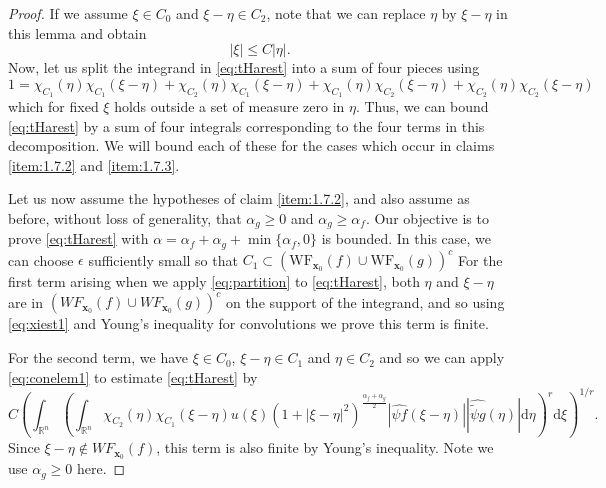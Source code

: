 \documentclass[a4paper,12pt]{amsart}
\numberwithin{equation}{section}
\theoremstyle{plain}
\numberwithin{theorem}{section}
\theoremstyle{definition}
\theoremstyle{remark}
\theoremstyle{remark}
\theoremstyle{remark}
\newcommand{\dd}{\mathrm{d}}  %
\newcommand{\WF}{\mathrm{WF}}                         %
\newcommand{\vx}{{\mathbf{x}}}
\begin{document}
\begin{proof}
    \noindent If we assume $\xi \in C_0$ and $\xi -\eta \in C_2$, note that we can replace $\eta$ by $\xi - \eta$ in this lemma and obtain
    \begin{equation}\label{eq:conelem2}
        |\xi| \leq C |\eta|.
    \end{equation}
    Now, let us split the integrand in \eqref{eq:tHarest} into a sum of four pieces using
    \begin{equation}\label{eq:partition}
    1 = \chi_{C_1}(\eta) \chi_{C_1}(\xi-\eta) + \chi_{C_2}(\eta) \chi_{C_1}(\xi-\eta) + \chi_{C_1}(\eta) \chi_{C_2}(\xi-\eta) + \chi_{C_2}(\eta)\chi_{C_2}(\xi-\eta)
    \end{equation}
    which for fixed $\xi$ holds outside a set of measure zero in $\eta$. Thus, we can bound \eqref{eq:tHarest} by a sum of four integrals corresponding to the four terms in this decomposition. We will bound each of these for the cases which occur in claims \eqref{item:1.7.2} and \eqref{item:1.7.3}.

    Let us now assume the hypotheses of claim \eqref{item:1.7.2}, and also assume as before, without loss of generality, that $\alpha_g \geq 0$ and $\alpha_g \geq \alpha_f$. Our objective is to prove \eqref{eq:tHarest} with $\alpha = \alpha_f + \alpha_g + \min\{\alpha_f,0\}$ is bounded. In this case, we can choose $\epsilon$ sufficiently small so that $C_1 \subset (\WF_{\vx_0}(f) \cup \WF_{\vx_0}(g))^c$ For the first term arising when we apply \eqref{eq:partition} to \eqref{eq:tHarest}, both $\eta$ and $\xi-\eta$ are in $(WF_{\vx_0}(f)\cup WF_{\vx_0}(g))^c$ on the support of the integrand, and so using \eqref{eq:xiest1} and Young's inequality for convolutions we prove this term is finite. 
    
    For the second term, we have $\xi \in C_0$, $\xi - \eta \in C_1$ and $\eta \in C_2$ and so we can apply \eqref{eq:conelem1} to estimate \eqref{eq:tHarest} by
    \begin{equation} \label{eq:2ndest}
    C \left (\int_{\mathbb{R}^n} \left ( \int_{\mathbb{R}^n}\chi_{C_2}(\eta) \chi_{C_1}(\xi-\eta) u(\xi) (1+|\xi-\eta|^2)^{\frac{\alpha_f + \alpha_g}{2}} |\widehat{\psi f}(\xi-\eta)| |\widehat{\widetilde{\psi} g}(\eta)| \dd \eta \right )^r \dd \xi \right )^{1/r}.
    \end{equation}
    Since $\xi - \eta \notin WF_{\vx_0}(f)$, this term is also finite by Young's inequality. Note we use $\alpha_g \geq 0$ here.
    

\end{proof}
\end{document}
